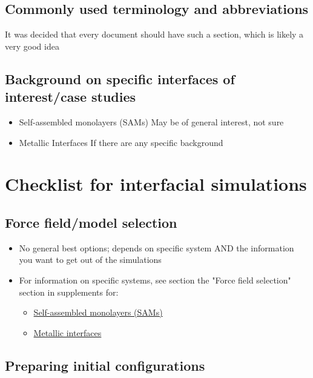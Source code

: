 \documentclass[9pt]{livecoms}
\begin{document}
\subsection{Commonly used terminology and abbreviations}
It was decided that every document should have such a section, which is likely a very good idea 

\subsection{Background on specific interfaces of interest/case studies}
\begin{itemize}
	\item Self-assembled monolayers (SAMs)
May be of general interest, not sure

	\item Metallic Interfaces
If there are any specific background 
\end{itemize}


\section{Checklist for interfacial simulations}
\label{sec:checklist}


\subsection{Force field/model selection}
\label{subsec:mainFF}

\begin{itemize}
	\item No general best options; depends on specific system AND the information you want to get out of the simulations
	\item For information on specific systems, see section the "Force field selection" section in supplements for:
	\begin{itemize}
		\item \hyperref[subsec:SAMFF]{Self-assembled monolayers (SAMs)}
		\item \hyperref[subsec:MetFF]{Metallic interfaces}
	\end{itemize}
\end{itemize}


\subsection{Preparing initial configurations}
\label{subsec:mainPrep}
\end{document}
